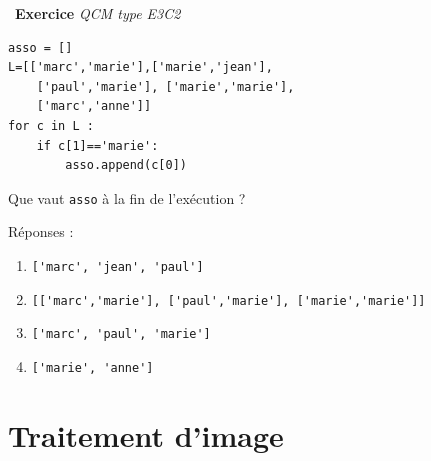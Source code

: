 \documentclass[a4paper, french, 12pt]{article}
\newcounter{exo}
\newenvironment{exercice}[1]
{\par \medskip   \addtocounter{exo}{1} \noindent  
\begin{bclogo}[arrondi =0.1,   noborder = true, logo=\bccrayon, marge=4]{~\textbf{Exercice} \textbf{\theexo} {\itshape #1} }  \par}
{
\end{bclogo}
 \par \bigskip }
\begin{document}
\begin{exercice}{QCM type E3C2}
\begin{enumerate}
\begin{lstlisting}[style=rond]
asso = []
L=[['marc','marie'],['marie','jean'],
    ['paul','marie'], ['marie','marie'],
    ['marc','anne']]
for c in L :
    if c[1]=='marie':
        asso.append(c[0])
\end{lstlisting}

Que vaut \texttt{asso} à la fin de l'exécution ?

Réponses :

\begin{enumerate}
\item   \lstinline!['marc', 'jean', 'paul']!
\item \lstinline![['marc','marie'], ['paul','marie'], ['marie','marie']]!
\item \lstinline!['marc', 'paul', 'marie']!
\item \lstinline!['marie', 'anne']!
\end{enumerate}

\end{enumerate}
\end{exercice}

\vspace*{-20pt}

\section{Traitement d'image}

\vspace*{-20pt}
\end{document}
